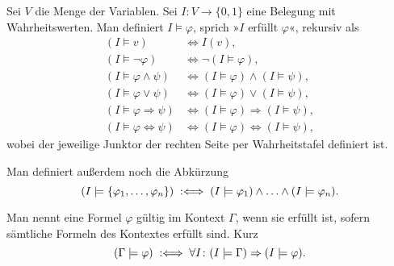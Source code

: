 \begin{Definition}\label{def:sat}\newlinefirst
Sei $V$ die Menge der Variablen. Sei $I\colon V\to\{0,1\}$ eine
Belegung mit Wahrheitswerten. Man definiert $I\models\varphi$,
sprich »$I$ erfüllt $\varphi$«, rekursiv als
\begin{align*}
(I\models v) &\iff I(v),\\
(I\models\neg\varphi) &\iff \neg (I\models\varphi),\\
(I\models \varphi\land\psi) &\iff (I\models\varphi)\land (I\models\psi),\\
(I\models \varphi\lor\psi) &\iff (I\models\varphi)\lor (I\models\psi),\\
(I\models \varphi\Rightarrow\psi) &\iff (I\models\varphi)\Rightarrow (I\models\psi),\\
(I\models \varphi\Leftrightarrow\psi) &\iff (I\models\varphi)\Leftrightarrow (I\models\psi),
\end{align*}
wobei der jeweilige Junktor der rechten Seite per Wahrheitstafel
definiert ist.
\end{Definition}
\begin{Definition}\label{def:sat-context}
Man definiert außerdem noch die Abkürzung
\[(I\models\{\varphi_1,\ldots,\varphi_n\})
\;:\Longleftrightarrow\; (I\models\varphi_1)\land\ldots\land (I\models\varphi_n).\]
\end{Definition}

\newpage
\begin{Definition}%
\label{def:valid}\newlinefirst
Man nennt eine Formel $\varphi$ gültig im Kontext $\Gamma$,
wenn sie erfüllt ist, sofern sämtliche Formeln des Kontextes
erfüllt sind. Kurz
\[(\Gamma\models\varphi) \;:\Longleftrightarrow\; \forall I\colon
(I\models\Gamma) \Rightarrow (I\models\varphi).\]
\end{Definition}

